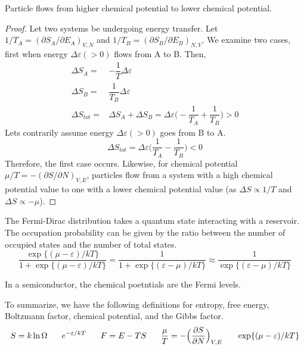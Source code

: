 \vspace{2ex}
\begin{thm}
Particle flows from higher chemical potential to lower chemical potential.
\end{thm}
\vspace{2ex}
\begin{proof}
Let two systems be undergoing energy transfer. Let $1/T_{A}=(\partial S_{A}/\partial E_{A})_{V,N}$ and $1/T_{B}=(\partial S_{B}/\partial E_{B})_{N,V}$. We examine two cases, first when energy $\Delta \varepsilon (>0)$ flows from A to B. Then,
\begin{align*}
	\Delta S_{A}=&-\dfrac{1}{T}\Delta \varepsilon \\
	\Delta S_{B}=&\dfrac{1}{T_{B}}\Delta \varepsilon \\
	\Delta S_{tot}=&\Delta S_{A}+\Delta S_{B}=\Delta \varepsilon \Big(-\dfrac{1}{T_{A}}+\dfrac{1}{T_{B}}\Big)>0
\end{align*}
Lets contrarily assume energy $\Delta \varepsilon (>0)$ goes from B to A.
\[\Delta S_{tot}=\Delta \varepsilon \Big(\dfrac{1}{T_{A}}-\dfrac{1}{T_{B}}\Big)<0\]
Therefore, the first case occurs. Likewise, for chemical potential $\mu /T=-(\partial S/\partial N)_{V,E}$, particles flow from a system with a high chemical potential value to one with a lower chemical potential value (as $\Delta S \propto 1/T$ and $\Delta S\propto -\mu $). 
\end{proof}
\vspace{2ex}
\begin{defi}
The Fermi-Dirac distribution takes a quantum state interacting with a reservoir. The occupation probability can be given by the ratio between the number of occupied states and the number of total states.
\[\dfrac{\exp\{(\mu -\varepsilon )/kT\}}{1+\exp\{(\mu -\varepsilon )/kT\}}=\dfrac{1}{1+\exp\{(\varepsilon -\mu )/kT\}}\approx \dfrac{1}{\exp\{(\varepsilon -\mu )/kT\}}\]
\end{defi}
\vspace{2ex}
\begin{rmk}
In a semiconductor, the chemical poetntials are the Fermi levels. 
\end{rmk}
\vspace{2ex}
\begin{rmk}
To summarize, we have the following definitions for entropy, free energy, Boltzmann factor, chemical potential, and the Gibbs factor.
\[
S=k\ln \mathrm{\Omega} \hspace{4ex}
e^{-\varepsilon /kT}\hspace{4ex}
F=E-TS\hspace{4ex}
\dfrac{\mu }{T}=-\Big(\dfrac{\partial S}{\partial N} \Big)_{V,E}\hspace{4ex}
\exp\{(\mu -\varepsilon )/kT\}
\]
\end{rmk}
